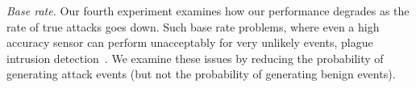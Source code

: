 \emph{Base rate.}
Our fourth experiment examines how our performance
degrades
as the rate of true attacks goes down.
Such base rate problems, where even a high accuracy sensor can perform unacceptably
for very unlikely events, plague intrusion detection~\cite{Axelsson:1999:BFI:319709.319710}.
We examine these issues by reducing
the probability of generating attack events
(but not the probability of generating benign events). 



